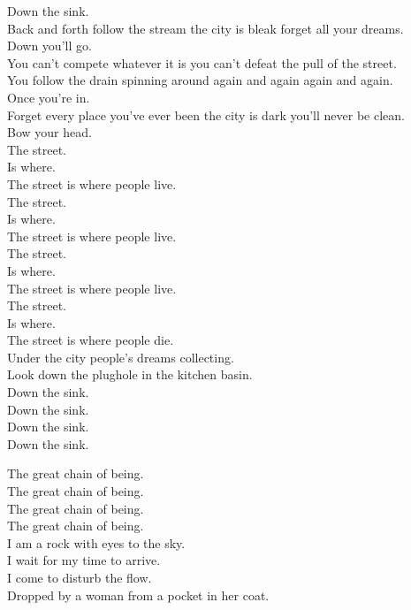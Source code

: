 Down the sink. \\
Back and forth follow the stream the city is bleak forget all your dreams. \\
Down you'll go. \\
You can't compete whatever it is you can't defeat the pull of the street. \\
You follow the drain spinning around again and again again and again. \\
Once you're in. \\
Forget every place you've ever been the city is dark you'll never be clean. \\
Bow your head. \\

The street. \\
Is where. \\
The street is where people live. \\
The street. \\
Is where. \\
The street is where people live. \\
The street. \\
Is where. \\
The street is where people live. \\
The street. \\
Is where. \\
The street is where people die. \\

Under the city people's dreams collecting. \\
Look down the plughole in the kitchen basin. \\

Down the sink. \\
Down the sink. \\
Down the sink. \\
Down the sink. \\




The great chain of being. \\
The great chain of being. \\
The great chain of being. \\
The great chain of being. \\

I am a rock with eyes to the sky. \\
I wait for my time to arrive. \\
I come to disturb the flow. \\
Dropped by a woman from a pocket in her coat. \\

